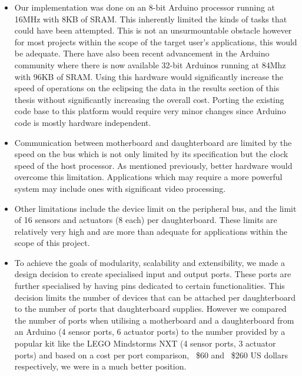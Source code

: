 \begin{itemize}
\item Our implementation was done on an 8-bit Arduino processor running at 16MHz with 8KB of SRAM. This inherently limited the kinds of tasks that could have been attempted. This is not an unsurmountable obstacle however for most projects within the scope of the target user's applications, this would be adequate. There have also been recent advancement in the Arduino community where there is now available 32-bit Arduinos running at 84Mhz with 96KB of SRAM. Using this hardware would significantly increase the speed of operations on the \xten eclipsing the data in the results section of this thesis without significantly increasing the overall cost. Porting the existing code base to this platform would require very minor changes since Arduino code is mostly hardware independent.

\item Communication between motherboard and daughterboard are limited by the speed on the \iic bus which is not only limited by its specification but the clock speed of the host processor. As mentioned previously, better hardware would overcome this limitation. Applications which may require a more powerful system may include ones with significant video processing.
\item Other limitations include the  device limit on the peripheral bus, and the limit of 16 sensors and actuators (8 each) per daughterboard. These limits are relatively very high and are more than adequate for applications within the scope of this project.
\item To achieve the goals of modularity, scalability and extensibility, we made a design decision to create specialised input and output ports. These ports are further specialised by having pins dedicated to certain functionalities. This decision limits the number of devices that can be attached per daughterboard to the number of ports that daughterboard supplies. However we compared the number of ports when utilising a motherboard and a daughterboard from an Arduino (4 sensor ports, 6 actuator ports) to the number provided by a popular kit like the LEGO Mindstorms NXT (4 sensor ports, 3 actuator ports) and based on a cost per port comparison, ~\$60 and ~\$260 US dollars respectively, we were in a much better position.
\end{itemize}

